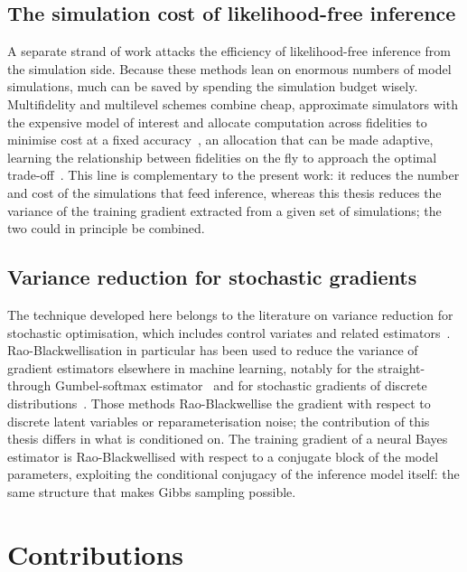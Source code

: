 \subsection{The simulation cost of likelihood-free inference}
\label{sec:rw-efficiency}

A separate strand of work attacks the efficiency of likelihood-free
inference from the simulation side. Because these methods lean on
enormous numbers of model simulations, much can be saved by spending
the simulation budget wisely. Multifidelity and multilevel schemes
combine cheap, approximate simulators with the expensive model of
interest and allocate computation across fidelities to minimise cost
at a fixed accuracy~\citep{warne2022multilevel}, an allocation that can
be made adaptive, learning the relationship between fidelities on the
fly to approach the optimal trade-off~\citep{prescott2024multifidelity}.
This line is complementary to the present work: it reduces the number
and cost of the simulations that feed inference, whereas this
thesis reduces the variance of the training gradient extracted
from a given set of simulations; the two could in principle be
combined.

\subsection{Variance reduction for stochastic gradients}
\label{sec:rw-variance}

The technique developed here belongs to the literature on variance
reduction for stochastic optimisation, which includes control variates
and related estimators~\citep{wang2013variance}. 
Rao-Blackwellisation
in particular has been used to reduce the variance of gradient
estimators elsewhere in machine learning, notably for the
straight-through Gumbel-softmax estimator~\citep{paulus2021raoblackwell}
and for stochastic gradients of discrete
distributions~\citep{liu2019raoblackwell}.
Those methods Rao-Blackwellise the gradient with respect to discrete latent
variables or reparameterisation noise; the contribution of this thesis
differs in what is conditioned on. The training gradient of a neural
Bayes estimator is Rao-Blackwellised with respect to a conjugate
block of the model parameters, exploiting the conditional conjugacy of
the inference model itself: the same structure that makes Gibbs
sampling possible.

\section{Contributions}
\label{sec:contributions}

